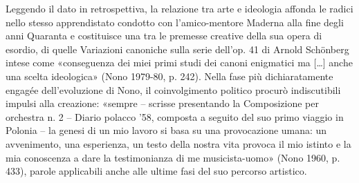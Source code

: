 Leggendo il dato in retrospettiva, la relazione tra arte e ideologia affonda le radici nello stesso apprendistato condotto con l’amico-mentore Maderna alla fine degli anni Quaranta e costituisce una tra le premesse creative della sua opera di esordio, di quelle Variazioni canoniche sulla serie dell’op. 41 di Arnold Schönberg intese come «conseguenza dei miei primi studi dei canoni enigmatici ma […] anche una scelta ideologica» (Nono 1979-80, p. 242). Nella fase più dichiaratamente engagée dell’evoluzione di Nono, il coinvolgimento politico procurò indiscutibili impulsi alla creazione: «sempre – scrisse presentando la Composizione per orchestra n. 2 – Diario polacco ’58, composta a seguito del suo primo viaggio in Polonia – la genesi di un mio lavoro si basa su una provocazione umana: un avvenimento, una esperienza, un testo della nostra vita provoca il mio istinto e la mia conoscenza a dare la testimonianza di me musicista-uomo» (Nono 1960, p. 433), parole applicabili anche alle ultime fasi del suo percorso artistico.

